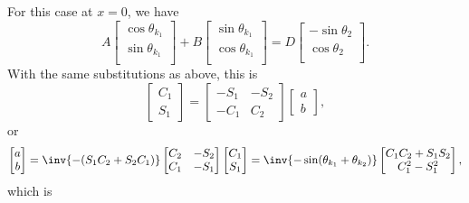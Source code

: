 \begin{enumerate}[(i)]
For this case at \( x = 0 \), we have
%
\begin{equation}\label{eqn:gradQuantumProblemSet4Problem3:940}
A
\begin{bmatrix}
\cos\theta_{k_1} \\
\sin\theta_{k_1} \\
\end{bmatrix}
+
B
\begin{bmatrix}
\sin\theta_{k_1} \\
\cos\theta_{k_1} \\
\end{bmatrix}
=
D
\begin{bmatrix}
-\sin \theta_2 \\
\cos \theta_2 \\
\end{bmatrix}.
\end{equation}
%
With the same substitutions as above, this is
%
\begin{equation}\label{eqn:gradQuantumProblemSet4Problem3:860}
\begin{bmatrix}
C_1 \\
S_1
\end{bmatrix}
=
\begin{bmatrix}
- S_1 & -S_2 \\
- C_1 & C_2
\end{bmatrix}
\begin{bmatrix}
a \\
b
\end{bmatrix},
\end{equation}
%
or
\begin{dmath}\label{eqn:gradQuantumProblemSet4Problem3:880}
\begin{bmatrix}
a \\
b
\end{bmatrix}
=
\inv{- (S_1 C_2 + S_2 C_1) }
\begin{bmatrix}
C_2 & -S_2 \\
C_1 & -S_1
\end{bmatrix}
\begin{bmatrix}
C_1 \\
S_1
\end{bmatrix}
=
\inv{-\sin(\theta_{k_1} + \theta_{k_2})}
\begin{bmatrix}
C_1 C_2 + S_1 S_2 \\
C_1^2 - S_1^2
\end{bmatrix},
\end{dmath}
%
which is


\end{enumerate}
